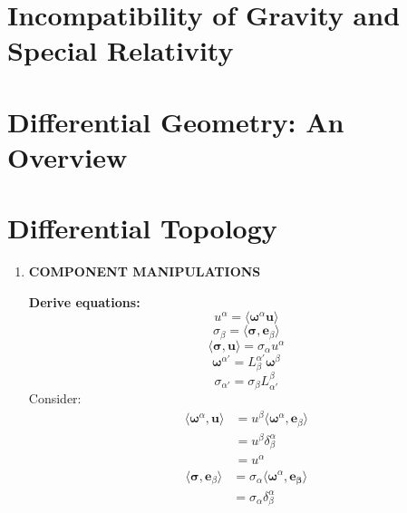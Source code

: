 \documentclass[9pt]{report}
\begin{document}
\chapter{Incompatibility of Gravity and Special Relativity}
\chapter{Differential Geometry: An Overview}
\chapter{Differential Topology}
\begin{enumerate}
  \item \textbf{COMPONENT MANIPULATIONS}

  \textbf{Derive equations:}
  \begin{equation}
    u^\alpha = \langle \boldsymbol{\omega}^\alpha \boldsymbol{u} \rangle
  \end{equation}
  \begin{equation}
    \sigma_\beta = \langle \boldsymbol{\sigma}, \boldsymbol{e}_\beta \rangle
  \end{equation}
  \begin{equation}
    \langle \boldsymbol{\sigma}, \boldsymbol{u} \rangle = \sigma_\alpha u^\alpha
  \end{equation}
  \begin{equation}
    \boldsymbol{\omega}^{\alpha'} = L^{\alpha'}_\beta \boldsymbol{\omega}^\beta
  \end{equation}
  \begin{equation}
    \sigma_{\alpha'} = \sigma_\beta L^\beta_{\alpha'}
  \end{equation}
  Consider:
  \[
    \begin{align}
      \langle \boldsymbol{\omega}^\alpha, \boldsymbol{u} \rangle &= u^\beta \langle \boldsymbol{\omega}^\alpha, \boldsymbol{e}_\beta \rangle \\
                                                                 &= u^\beta \delta^\alpha_\beta \\
                                                                 &= u^\alpha
    \end{align}
  \]
  \[
    \begin{align}
      \langle \boldsymbol{\sigma}, \boldsymbol{e}_\beta \rangle &= \sigma_\alpha \langle \boldsymbol{\omega}^\alpha, \boldsymbol{e_\beta} \rangle \\
      &= \sigma_\alpha \delta^\alpha_\beta \\

\end{align}\]
\end{enumerate}
\end{document}
